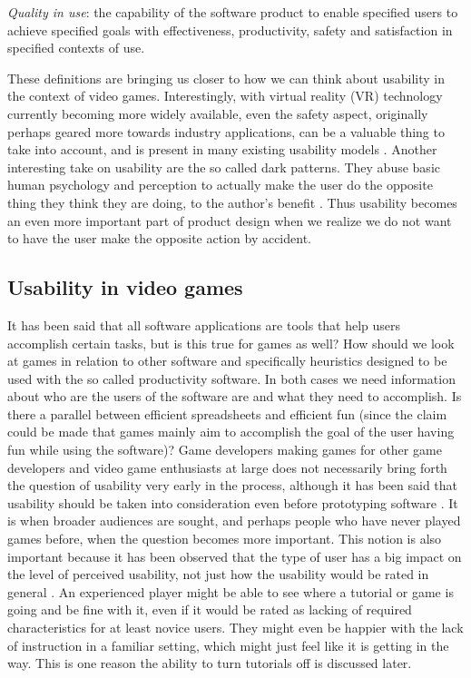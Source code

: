 \begin{displayquote}
	
	\textit{Quality in use}: the capability of the software product to enable specified users to achieve specified goals with effectiveness, productivity, safety and satisfaction in specified contexts of use.
	
\end{displayquote}

These definitions are bringing us closer to how we can think about usability in the context of video games. Interestingly, with virtual reality (VR) technology currently becoming more widely available, even the safety aspect, originally perhaps geared more towards industry applications, can be a valuable thing to take into account, and is present in many existing usability models \cite{Dubey2012}. Another interesting take on usability are the so called dark patterns. They abuse basic human psychology and perception to actually make the user do the opposite thing they think they are doing, to the author's benefit \cite{Brignull2013}. Thus usability becomes an even more important part of product design when we realize we do not want to have the user make the opposite action by accident.

\subsection{Usability in video games}

It has been said that all software applications are tools that help users accomplish certain tasks, but is this true for games as well? How should we look at games in relation to other software and specifically heuristics designed to be used with the so called productivity software. In both cases we need information about who are the users of the software are and what they need to accomplish. \cite{Ferre2001} Is there a parallel between efficient spreadsheets and efficient fun (since the claim could be made that games mainly aim to accomplish the goal of the user having fun while using the software)? Game developers making games for other game developers and video game enthusiasts at large does not necessarily bring forth the question of usability very early in the process, although it has been said that usability should be taken into consideration even before prototyping software \cite{Holzinger2005}. It is when broader audiences are sought, and perhaps people who have never played games before, when the question becomes more important. \cite{Isbister2008} This notion is also important because it has been observed that the type of user has a big impact on the level of perceived usability, not just how the usability would be rated in general \cite{Cavallin2007}. An experienced player might be able to see where a tutorial or game is going and be fine with it, even if it would be rated as lacking of required characteristics for at least novice users. They might even be happier with the lack of instruction in a familiar setting, which might just feel like it is getting in the way. This is one reason the ability to turn tutorials off is discussed later.

